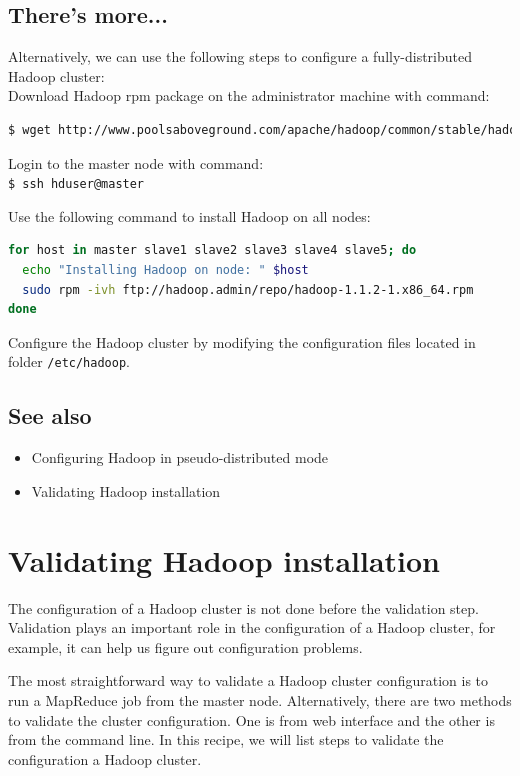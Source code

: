 \subsection*{There's more...}
Alternatively, we can use the following steps to configure a fully-distributed Hadoop cluster: \\
Download Hadoop rpm package on the administrator machine with command:
\lstset{style=bashstyle}
\begin{lstlisting}[language=bash]
$ wget http://www.poolsaboveground.com/apache/hadoop/common/stable/hadoop-1.1.2-1.x86_64.rpm -P ~/repo
\end{lstlisting}

Login to the master node with command: \\
\verb|$ ssh hduser@master|

Use the following command to install Hadoop on all nodes:
\lstset{style=bashstyle}
\begin{lstlisting}[language=bash]
for host in master slave1 slave2 slave3 slave4 slave5; do
  echo "Installing Hadoop on node: " $host
  sudo rpm -ivh ftp://hadoop.admin/repo/hadoop-1.1.2-1.x86_64.rpm
done
\end{lstlisting}

Configure the Hadoop cluster by modifying the configuration files located in folder \verb|/etc/hadoop|. \\
\subsection*{See also}
\begin{itemize}
  \item Configuring Hadoop in pseudo-distributed mode
  \item Validating Hadoop installation
\end{itemize}

\section{Validating Hadoop installation}
The configuration of a Hadoop cluster is not done before the validation step. Validation plays an important role in the configuration of a Hadoop cluster, for example, it can help us figure out configuration problems.

The most straightforward way to validate a Hadoop cluster configuration is to run a MapReduce job from the master node. Alternatively, there are two methods to validate the cluster configuration. One is from web interface and the other is from the command line. In this recipe, we will list steps to validate the configuration a Hadoop cluster.
